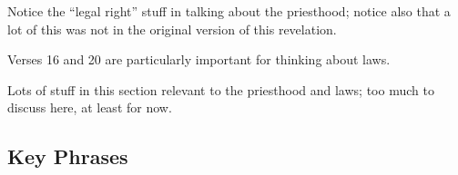 \begin{compactdesc}
				\begin{compactitem}
					\item Notice the ``legal right'' stuff in talking about the priesthood; notice also that a lot of this was not in the original version of this revelation.
					\item Verses 16 and 20 are particularly important for thinking about laws.
				\end{compactitem}
			\item[{\hyperref[DC70-8]{DC 70:8}}]
			\item[{\hyperref[DC82-3]{DC 82:3--4}}]
			\item[{\hyperref[DC98-4]{DC 98:4--8}}]
			\item[{\hyperref[DC98-32]{DC 98:32--33}}]
			\item[{\hyperref[DC101-77]{DC 101:77--78}}]
			\item[{\hyperref[DC102-4]{DC 102:4}}]
			\item[{\hyperref[DC105-4]{DC 105:4--5}}]
			\item[{\hyperref[DC130-20]{DC 130:20--21}}]
			\item[{\hyperref[DC132-5]{DC 132:5}}]
			\item[{\hyperref[DC132]{DC 132}}] \phantom{.}
				\begin{compactitem}
					\item Lots of stuff in this section relevant to the priesthood and laws; too much to discuss here, at least for now.
				\end{compactitem}
		\end{compactdesc}
		
	
		
		
\subsection{Key Phrases} %
	\label{LAW-PHRASES}

